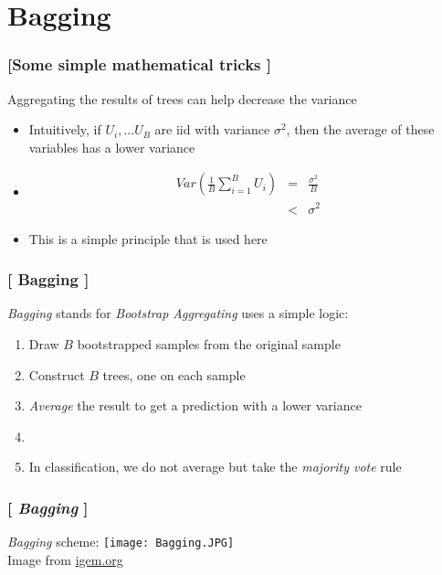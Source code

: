 \documentclass[xcolor=x11names,compress]{beamer}
\renewcommand{\(}{\begin{columns}}
\renewcommand{\)}{\end{columns}}
\newcommand{\<}[1]{\begin{column}{#1}}
\renewcommand{\>}{\end{column}}
\begin{document}
\section{Bagging}

\begin{frame}
\frametitle{\textcolor{brique}{[Some simple mathematical tricks ]}}
Aggregating the results of trees can help decrease the variance %
\pause
\begin{itemize}[<+->]
    \item  Intuitively, if $U_{i}, \ldots U_{B}$ are  iid with variance $\sigma^{2}$, then the average of these variables has a lower variance
    \item[]
\begin{eqnarray*}
Var \left( \frac{1}{B} \sum_{i=1}^{B} U_i \right) &=&  \frac{\sigma^{2}}{B} \\
            & < & \sigma^{2}
\end{eqnarray*}
    \item This is a simple principle that is used here
\end{itemize}
\end{frame}

\begin{frame}
\frametitle{\textcolor{brique}{[ Bagging ]}}
\textit{Bagging} stands for \textit{Bootstrap Aggregating} uses a simple logic:
\pause
\begin{enumerate}[<+->]
    \item Draw $B$ bootstrapped samples from the original sample
    \item Construct $B$ trees, one on each sample
    \item  \textit{Average} the result to get a prediction  with a lower variance
    \item[]
    \item[]In classification, we do not average but take the \emph{majority vote} rule
\end{enumerate}
\end{frame}

\begin{frame}
\frametitle{\textcolor{brique}{[ \textit{Bagging} ]}}
\textit{Bagging} scheme:
\texttt{[image: Bagging.JPG]}\\
\vfill
\textcolor{gris}{\small Image from \href{http://2018.igem.org/Team:Jilin_China/Model/Screening_System}{igem.org}}

\end{frame}
\end{document}
